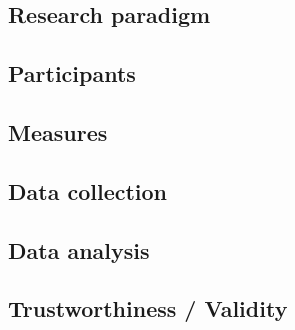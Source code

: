 \documentclass[11pt,a4paper]{article}
\begin{document}
\subsection{Research paradigm} %

\subsection{Participants}

\subsection{Measures} %

\subsection{Data collection}

\subsection{Data analysis}

\subsection{Trustworthiness / Validity}
\end{document}
